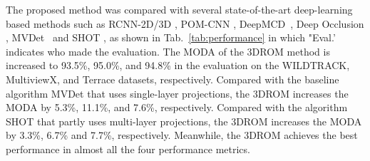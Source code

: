 \documentclass[runningheads]{llncs}
\begin{document}
	The proposed method was compared with several state-of-the-art deep-learning based methods such as RCNN-2D/3D \cite{xu2016multi}, POM-CNN \cite{fleuret2007multicamera}, DeepMCD~\cite{chavdarova2017deep}, Deep Occlusion \cite{baque2017deep}, MVDet~\cite{hou2020multiview} and SHOT \cite{song2021stacked}, as shown in Tab.~\ref{tab:performance} in which "Eval.' indicates who made the evaluation. The MODA of the 3DROM method is increased to 93.5\%, 95.0\%, and 94.8\% in the evaluation on the WILDTRACK, MultiviewX, and Terrace datasets, respectively. Compared with the baseline algorithm MVDet that uses single-layer projections, the 3DROM increases the MODA by 5.3\%, 11.1\%, and 7.6\%, respectively. Compared with the algorithm SHOT that partly uses multi-layer projections, the 3DROM increases the MODA by 3.3\%, 6.7\% and 7.7\%, respectively. Meanwhile, the 3DROM achieves the best performance in almost all the four performance metrics.
\end{document}
